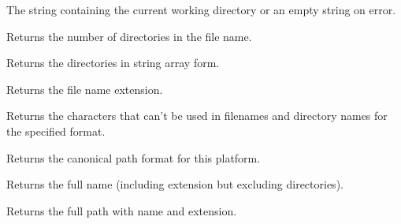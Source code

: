 
The string containing the current working directory or an empty string on
error.




\label{wxfilenamegetdircount}


Returns the number of directories in the file name.


\label{wxfilenamegetdirs}


Returns the directories in string array form.


\label{wxfilenamegetext}


Returns the file name extension.


\label{wxfilenamegetforbiddenchars}


Returns the characters that can't be used in filenames and directory names for the specified format.


\label{wxfilenamegetformat}


Returns the canonical path format for this platform.


\label{wxfilenamegetfullname}


Returns the full name (including extension but excluding directories).


\label{wxfilenamegetfullpath}


Returns the full path with name and extension.


\label{wxfilenamegethomedir}

